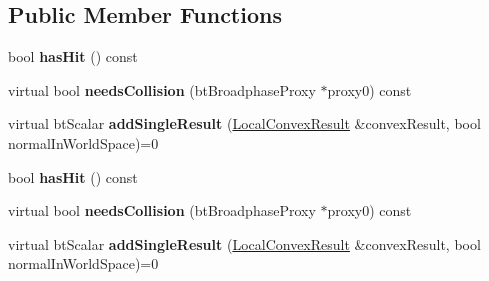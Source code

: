 \subsection*{Public Member Functions}
\begin{DoxyCompactItemize}
\item 
\mbox{\label{structbtCollisionWorld_1_1ConvexResultCallback_a4a3ee028b3adef9acb2c3421d4415e21}} 
bool {\bfseries has\+Hit} () const
\item 
\mbox{\label{structbtCollisionWorld_1_1ConvexResultCallback_a2158fb9b03399bcc9947c8b4051fc730}} 
virtual bool {\bfseries needs\+Collision} (bt\+Broadphase\+Proxy $\ast$proxy0) const
\item 
\mbox{\label{structbtCollisionWorld_1_1ConvexResultCallback_ad556dcf14b042151a6dc0cc154597a9a}} 
virtual bt\+Scalar {\bfseries add\+Single\+Result} (\hyperlink{structbtCollisionWorld_1_1LocalConvexResult}{Local\+Convex\+Result} \&convex\+Result, bool normal\+In\+World\+Space)=0
\item 
\mbox{\label{structbtCollisionWorld_1_1ConvexResultCallback_a4a3ee028b3adef9acb2c3421d4415e21}} 
bool {\bfseries has\+Hit} () const
\item 
\mbox{\label{structbtCollisionWorld_1_1ConvexResultCallback_a2158fb9b03399bcc9947c8b4051fc730}} 
virtual bool {\bfseries needs\+Collision} (bt\+Broadphase\+Proxy $\ast$proxy0) const
\item 
\mbox{\label{structbtCollisionWorld_1_1ConvexResultCallback_ad556dcf14b042151a6dc0cc154597a9a}} 
virtual bt\+Scalar {\bfseries add\+Single\+Result} (\hyperlink{structbtCollisionWorld_1_1LocalConvexResult}{Local\+Convex\+Result} \&convex\+Result, bool normal\+In\+World\+Space)=0
\end{DoxyCompactItemize}
